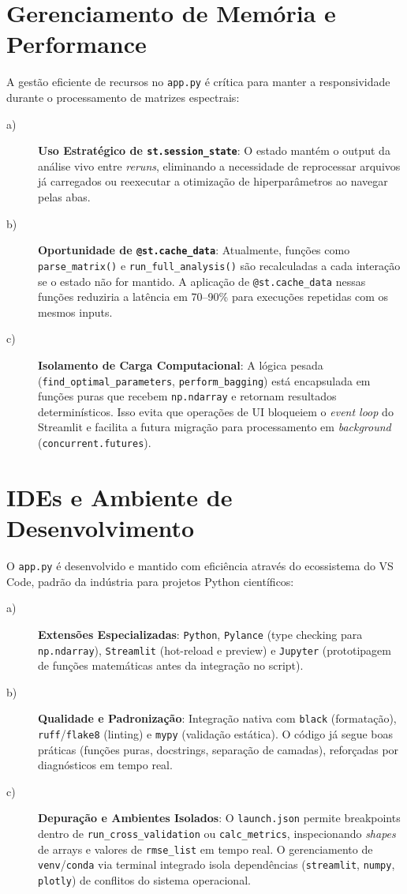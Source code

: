 \section{Gerenciamento de Memória e Performance}
A gestão eficiente de recursos no \verb|app.py| é crítica para manter a responsividade durante o processamento de matrizes espectrais:
\begin{description}
\item[a)] \textbf{Uso Estratégico de \texttt{st.session\_state}}: O estado mantém o output da análise vivo entre \textit{reruns}, eliminando a necessidade de reprocessar arquivos já carregados ou reexecutar a otimização de hiperparâmetros ao navegar pelas abas.
\item[b)] \textbf{Oportunidade de \texttt{@st.cache\_data}}: Atualmente, funções como \verb|parse_matrix()| e \verb|run_full_analysis()| são recalculadas a cada interação se o estado não for mantido. A aplicação de \verb|@st.cache_data| nessas funções reduziria a latência em 70--90\% para execuções repetidas com os mesmos inputs.
\item[c)] \textbf{Isolamento de Carga Computacional}: A lógica pesada (\verb|find_optimal_parameters|, \verb|perform_bagging|) está encapsulada em funções puras que recebem \verb|np.ndarray| e retornam resultados determinísticos. Isso evita que operações de UI bloqueiem o \textit{event loop} do Streamlit e facilita a futura migração para processamento em \textit{background} (\verb|concurrent.futures|).
\end{description}

\section{IDEs e Ambiente de Desenvolvimento}
O \verb|app.py| é desenvolvido e mantido com eficiência através do ecossistema do VS Code, padrão da indústria para projetos Python científicos:
\begin{description}
\item[a)] \textbf{Extensões Especializadas}: \texttt{Python}, \texttt{Pylance} (type checking para \verb|np.ndarray|), \texttt{Streamlit} (hot-reload e preview) e \texttt{Jupyter} (prototipagem de funções matemáticas antes da integração no script).
\item[b)] \textbf{Qualidade e Padronização}: Integração nativa com \texttt{black} (formatação), \texttt{ruff}/\texttt{flake8} (linting) e \texttt{mypy} (validação estática). O código já segue boas práticas (funções puras, docstrings, separação de camadas), reforçadas por diagnósticos em tempo real.
\item[c)] \textbf{Depuração e Ambientes Isolados}: O \texttt{launch.json} permite breakpoints dentro de \verb|run_cross_validation| ou \verb|calc_metrics|, inspecionando \textit{shapes} de arrays e valores de \verb|rmse_list| em tempo real. O gerenciamento de \texttt{venv}/\texttt{conda} via terminal integrado isola dependências (\verb|streamlit|, \verb|numpy|, \verb|plotly|) de conflitos do sistema operacional.
\end{description}

